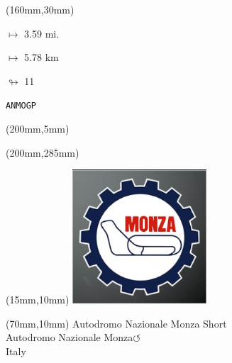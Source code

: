 \begin{textblock*}{40mm}(160mm,30mm)%
\Large
\par$\mapsto$ 3.59 mi.
\par$\mapsto$ 5.78 km
\par$\looparrowright$ 11
\par\hfill\tiny\tt ANMOGP\\
\end{textblock*}
\begin{textblock*}{20mm}(200mm,5mm)%
\fbox{\thepage}
\label{ANMOGP}
\end{textblock*}
\begin{textblock*}{20mm}(200mm,285mm)%
\fbox{\thepage}
\end{textblock*}

\null\newpage
\begin{textblock*}{50mm}(15mm,10mm)%
\includegraphics[width=50mm]{LG/2015-05-20_00086.png}
\end{textblock*}
\begin{textblock*}{130mm}(70mm,10mm)%
{\fontsize{20}{20}\selectfont Autodromo Nazionale Monza Short\\}
{\fontsize{16}{16}\selectfont Autodromo Nazionale Monza\hfill \huge$\circlearrowleft$\\}
{\fontsize{12}{12}\selectfont Italy\\}
\end{textblock*}
